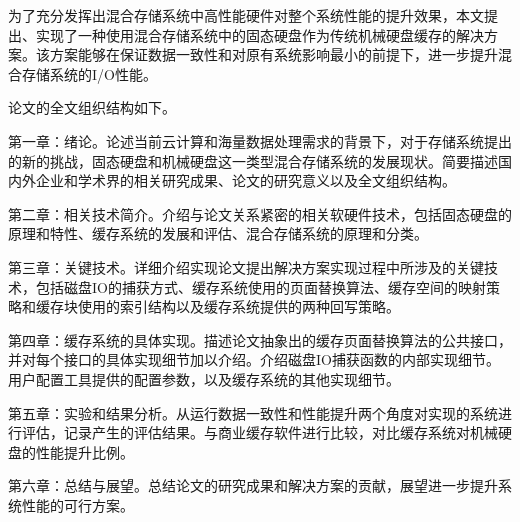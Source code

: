 为了充分发挥出混合存储系统中高性能硬件对整个系统性能的提升效果，本文提出、实现了一种使用混合存储系统中的固态硬盘作为传统机械硬盘缓存的解决方案。该方案能够在保证数据一致性和对原有系统影响最小的前提下，进一步提升混合存储系统的I/O性能。

论文的全文组织结构如下。

第一章：绪论。论述当前云计算和海量数据处理需求的背景下，对于存储系统提出的新的挑战，固态硬盘和机械硬盘这一类型混合存储系统的发展现状。简要描述国内外企业和学术界的相关研究成果、论文的研究意义以及全文组织结构。

第二章：相关技术简介。介绍与论文关系紧密的相关软硬件技术，包括固态硬盘的原理和特性、缓存系统的发展和评估、混合存储系统的原理和分类。

第三章：关键技术。详细介绍实现论文提出解决方案实现过程中所涉及的关键技术，包括磁盘IO的捕获方式、缓存系统使用的页面替换算法、缓存空间的映射策略和缓存块使用的索引结构以及缓存系统提供的两种回写策略。

第四章：缓存系统的具体实现。描述论文抽象出的缓存页面替换算法的公共接口，并对每个接口的具体实现细节加以介绍。介绍磁盘IO捕获函数的内部实现细节。用户配置工具提供的配置参数，以及缓存系统的其他实现细节。

第五章：实验和结果分析。从运行数据一致性和性能提升两个角度对实现的系统进行评估，记录产生的评估结果。与商业缓存软件进行比较，对比缓存系统对机械硬盘的性能提升比例。

第六章：总结与展望。总结论文的研究成果和解决方案的贡献，展望进一步提升系统性能的可行方案。

